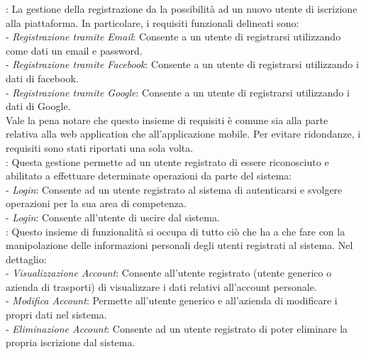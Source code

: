 : La gestione della registrazione da la possibilità ad un nuovo utente di iscrizione alla piattaforma. In particolare, i requisiti funzionali delineati sono:\\

 - \emph{Registrazione tramite Email}: Consente a un utente di registrarsi utilizzando come dati un email e password.\\
 - \emph{Registrazione tramite Facebook}: Consente a un utente di registrarsi utilizzando i dati di facebook.\\
 - \emph{Registrazione tramite Google}: Consente a un utente di registrarsi utilizzando i dati di Google.\\

Vale la pena notare che questo insieme di requisiti \`{e} comune sia alla parte relativa alla web application che all'applicazione mobile. Per evitare ridondanze, i requisiti sono stati riportati una sola volta.\\

: Questa gestione permette ad un utente registrato di essere riconosciuto e abilitato a effettuare determinate operazioni da parte del sistema:\\

 - \emph{Login}: Consente ad un utente registrato al sistema di autenticarsi e svolgere operazioni per la sua area di competenza.\\

 - \emph{Login}: Consente all’utente di uscire dal sistema.\\

: Questo insieme di funzionalit\`{a} si occupa di tutto ciò che ha a che fare con la manipolazione delle informazioni personali degli utenti registrati al sistema. Nel dettaglio:\\

 - \emph{Visualizzazione Account}: Consente all'utente registrato (utente generico o azienda di trasporti) di visualizzare i dati relativi all’account personale.\\

 - \emph{Modifica Account}: Permette all’utente generico e all’azienda di modificare i propri dati nel sistema.\\

 - \emph{Eliminazione Account}: Consente ad un utente registrato di poter eliminare la propria iscrizione dal sistema.\\

